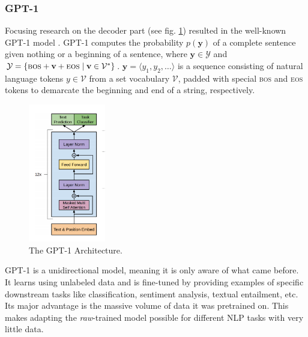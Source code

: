 \subsubsection{GPT-1}
Focusing research on the decoder part (see fig. \ref{fig:gpt}) resulted in the well-known GPT-1 model \cite{radford2018improving}. GPT-1 computes the probability $p(\mathbf{y})$ of a complete sentence given nothing or a beginning of a sentence, where $\mathbf{y}\in\mathcal{Y}$ and $\mathcal{Y} = \{\textsc{bos}+\mathbf{v}+\textsc{eos}\mid \mathbf{v} \in \mathcal{V}^* \}$. $\mathbf{y}= \langle y_1, y_2, \dots\rangle$ is a sequence consisting of natural language tokens  $y\in\mathcal{V}$ from a set vocabulary $\mathcal{V}$, padded with special \textsc{bos} and \textsc{eos} tokens to demarcate the beginning and end of a string, respectively. 
\begin{figure}[H]
    \centering
    \includegraphics[width=0.3\textwidth]{figures/gptarch}
    \caption{The GPT-1 Architecture. \cite{radford2018improving}}
    \label{fig:gpt}
\end{figure}
GPT-1 is a unidirectional model, meaning it is only aware of what came before. It learns using unlabeled data and is fine-tuned by providing examples of specific downstream tasks like classification, sentiment analysis, textual entailment, etc. Its major advantage is the massive volume of data it was pretrained on. This makes adapting the \textit{raw}-trained model possible for different NLP tasks with very little data. 

